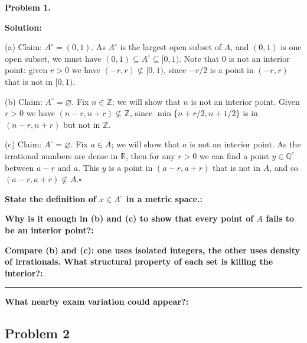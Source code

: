 \documentclass[12pt]{article}
\newcommand{\fillfield}[1]{%
  \par\noindent\textbf{#1:}\enspace\hrulefill\par\vspace{3pt}%
}
\newcommand{\fillfieldlong}[1]{%
  \par\noindent\textbf{#1:}\par\vspace{1.5cm}%
  \noindent\rule{\linewidth}{0.35pt}\par\vspace{4pt}%
}
\begin{document}
\newpage

\begin{tcolorbox}[
  enhanced, breakable,
  colback  = solgreen,
  colframe = green!45!black,
  fonttitle = \bfseries,
  title = {\textsc{Official Solution}\hfill Homework 8 -- Selected Solutions}
]
\textbf{Problem 1.}

\medskip\textbf{Solution:}

\medskip
(a) Claim: $A^\circ = (0, 1)$. As $A^\circ$ is the largest open subset of $A$, and $(0, 1)$ is one
open subset, we must have $(0, 1) \subseteq A^\circ \subseteq [0, 1)$. Note that $0$ is not an
interior point: given $r > 0$ we have $(-r, r) \not\subseteq [0, 1)$, since $-r/2$ is a point in
$(-r, r)$ that is not in $[0, 1)$.

\medskip
(b) Claim: $A^\circ = \varnothing$. Fix $n \in \mathbb{Z}$; we will show that $n$ is not an interior
point. Given $r > 0$ we have $(n-r, n+r) \not\subseteq \mathbb{Z}$, since $\min\{n+r/2, n+1/2\}$ is
in $(n-r, n+r)$ but not in $\mathbb{Z}$.

\medskip
(c) Claim: $A^\circ = \varnothing$. Fix $a \in A$; we will show that $a$ is not an interior point.
As the irrational numbers are dense in $\mathbb{R}$, then for any $r > 0$ we can find a point
$y \in \mathbb{Q}^c$ between $a-r$ and $a$. This $y$ is a point in $(a-r, a+r)$ that is not in
$A$, and so $(a-r, a+r) \not\subseteq A$.\hfill$\square$
\end{tcolorbox}

\bigskip

\begin{tcolorbox}[
  enhanced, breakable,
  colback  = reflectcyan,
  colframe = cyan!55!black,
  fonttitle = \bfseries,
  title = {\textsc{Reflection \& Variation}}
]
\fillfield{State the definition of $x \in A^\circ$ in a metric space.}
\fillfield{Why is it enough in (b) and (c) to show that every point of $A$ fails to be an interior point?}
\fillfieldlong{Compare (b) and (c): one uses isolated integers, the other uses density of irrationals. What structural property of each set is killing the interior?}
\fillfield{What nearby exam variation could appear?}
\end{tcolorbox}

\newpage
\subsection{Problem 2}
\end{document}
